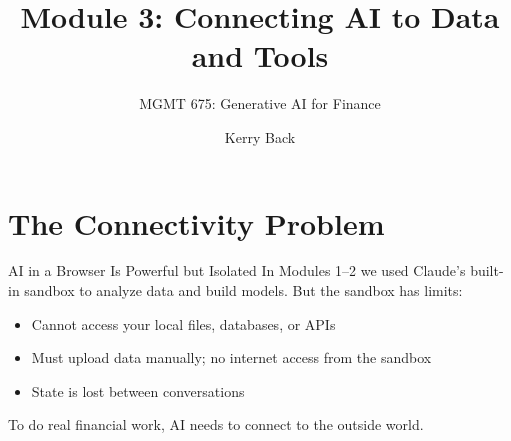 \documentclass[aspectratio=169]{beamer}
\subtitle{MGMT 675: Generative AI for Finance}
\title{Module 3: Connecting AI to Data and Tools}
\author{Kerry Back}
\date{}
\begin{document}
\maketitle

\section{The Connectivity Problem}

\begin{frame}{AI in a Browser Is Powerful but Isolated}
In Modules 1--2 we used Claude's built-in sandbox to analyze data and build models. But the sandbox has limits:
\vspace{0.3cm}
\begin{itemize}
  \item Cannot access your local files, databases, or APIs
  \item Must upload data manually; no internet access from the sandbox
  \item State is lost between conversations
\end{itemize}
\vspace{0.3cm}
\alert{To do real financial work, AI needs to connect to the outside world.}
\end{frame}
\end{document}
